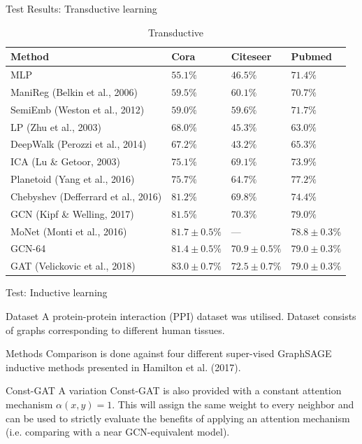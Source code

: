 \documentclass{beamer}
\theoremstyle{definition}
\begin{document}
\begin{frame}{Test Results: Transductive learning}
    \begin{tiny}
    \begin{table}
      \caption{Transductive}
      \label{table:1}
      \begin{tabular}{ l l l l }
        \hline
        Method & Cora & Citeseer & Pubmed \\
        \hline
        MLP & $55.1\%$ & $46.5\%$ & $71.4\%$ \\
        ManiReg (Belkin et al., 2006) & $59.5\%$ & $60.1\%$ & $70.7\%$ \\
        SemiEmb (Weston et al., 2012) & $59.0\%$ & $59.6\%$ & $71.7\%$ \\
        LP (Zhu et al., 2003) & $68.0\%$ & $45.3\%$ & $63.0\%$ \\
        DeepWalk (Perozzi et al., 2014) & $67.2\%$ & $43.2\%$ & $65.3\%$ \\
        ICA (Lu \& Getoor, 2003) & $75.1\%$ & $69.1\%$ & $73.9\%$ \\
        Planetoid (Yang et al., 2016) & $75.7\%$ & $64.7\%$ & $77.2\%$ \\
        Chebyshev (Defferrard et al., 2016) & $81.2\%$ & $69.8\%$ & $74.4\%$ \\
        GCN (Kipf \& Welling, 2017) & $81.5\%$ & $70.3\%$ & $79.0\%$ \\
        MoNet (Monti et al., 2016) & $81.7\pm0.5\%$ & — & $78.8\pm0.3\%$ \\
        \hline
        GCN-64 & $81.4\pm0.5\%$ & $70.9\pm0.5\%$ & $79.0\pm0.3\%$ \\
        GAT (Velickovic et al., 2018) & $83.0\pm0.7\%$ & $72.5\pm0.7\%$ & $79.0\pm0.3\%$ \\
        \hline
      \end{tabular}
    \end{table}
    \end{tiny}
\end{frame}

\begin{frame}{Test: Inductive learning}
    \begin{block}{Dataset}
        A protein-protein interaction (PPI) dataset was utilised. Dataset consists of graphs corresponding to different human tissues.
    \end{block}
    \begin{block}{Methods}
        Comparison is done against four different super-vised GraphSAGE inductive methods presented in Hamilton et al. (2017).
    \end{block} \pause
    \begin{block}{Const-GAT}
        A variation Const-GAT is also provided with a constant attention mechanism \(\alpha(x,y) = 1\). This will assign the same weight to every neighbor and can be used to strictly evaluate the benefits of applying an attention mechanism (i.e. comparing with a near GCN-equivalent model).
    \end{block}
\end{frame}
\end{document}
